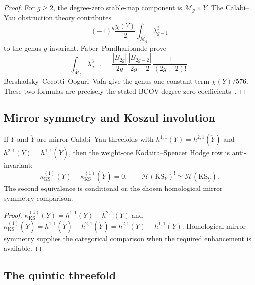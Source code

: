 \begin{proof}
For $g\ge2$, the degree-zero stable-map component is
$\overline{\mathcal M}_g\times Y$.  The Calabi--Yau obstruction
theory contributes
\[
(-1)^g\frac{\chi(Y)}{2}
\int_{\overline{\mathcal M}_g}\lambda_{g-1}^3
\]
to the genus-$g$ invariant.  Faber--Pandharipande prove
\[
\int_{\overline{\mathcal M}_g}\lambda_{g-1}^3
=
\frac{|B_{2g}|}{2g}\,
\frac{|B_{2g-2}|}{2g-2}\,
\frac{1}{(2g-2)!}.
\]
Bershadsky--Cecotti--Ooguri--Vafa give the genus-one constant
term $\chi(Y)/576$.  These two formulas are precisely the stated
BCOV degree-zero coefficients~\cite{BCOV94,FP00}.
\end{proof}


\subsection{Mirror symmetry and Koszul involution}

\begin{corollary}
If $Y$ and $\check{Y}$ are mirror Calabi--Yau threefolds with
$h^{1,1}(Y) = h^{2,1}(\check{Y})$ and
$h^{2,1}(Y) = h^{1,1}(\check{Y})$, then the weight-one
Kodaira--Spencer Hodge row is anti-invariant:
\begin{equation}%
\kappa_{\mathrm{KS}}^{(1)}(Y) + \kappa_{\mathrm{KS}}^{(1)}(\check{Y}) = 0,
\qquad
\mathcal{H}(\mathrm{KS}_Y)^! \simeq \mathcal{H}(\mathrm{KS}_{\check{Y}}).
\end{equation}
The second equivalence is conditional on the chosen homological mirror
symmetry comparison.
\end{corollary}

\begin{proof}
$\kappa_{\mathrm{KS}}^{(1)}(Y) = h^{1,1}(Y) - h^{2,1}(Y)$ and
$\kappa_{\mathrm{KS}}^{(1)}(\check{Y}) =
h^{1,1}(\check{Y}) - h^{2,1}(\check{Y})
= h^{2,1}(Y) - h^{1,1}(Y)$.
Homological mirror symmetry supplies the categorical comparison when
the required enhancement is available.
\end{proof}


\subsection{The quintic threefold}

